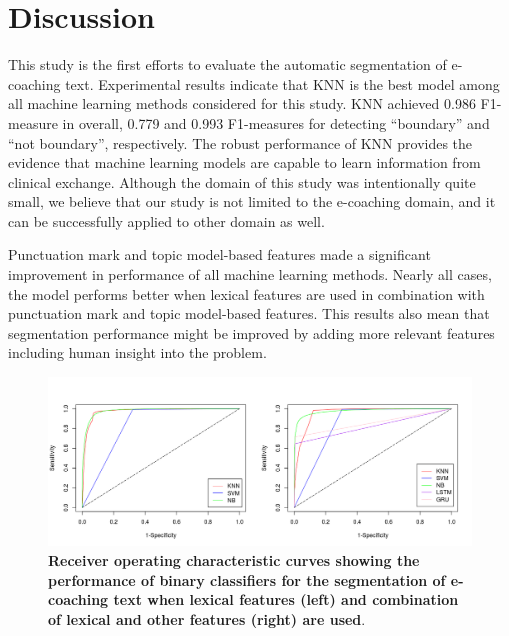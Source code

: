 \documentclass{amia}
\begin{document}
\section*{Discussion}
This study is the first efforts to evaluate the automatic segmentation of e-coaching text. Experimental results indicate that KNN is the best model among all machine learning methods considered for this study. KNN achieved 0.986 F1-measure in overall, 0.779 and 0.993 F1-measures for detecting ``boundary'' and ``not boundary'', respectively. The robust performance of KNN provides the evidence that machine learning models are capable to learn information from clinical exchange. Although the domain of this study was intentionally quite small, we believe that our study is not limited to the e-coaching domain, and it can be successfully applied to other domain as well.

Punctuation mark and topic model-based features made a significant improvement in performance of all machine learning methods. Nearly all cases, the model performs better when lexical features are used in combination with punctuation mark and topic model-based features. This results also mean that segmentation performance might be improved by adding more relevant features including human insight into the problem.       

\begin{figure}[!htb]
    \centering
    \includegraphics[width=1.0\textwidth]{figures/roc-curves.png}
    \caption{\textbf{Receiver operating characteristic curves showing the performance of binary classifiers for the segmentation of e-coaching text when lexical features (left) and combination of lexical and other features (right) are used}.}
    \label{fig:roc-curves}
\end{figure}
\end{document}
